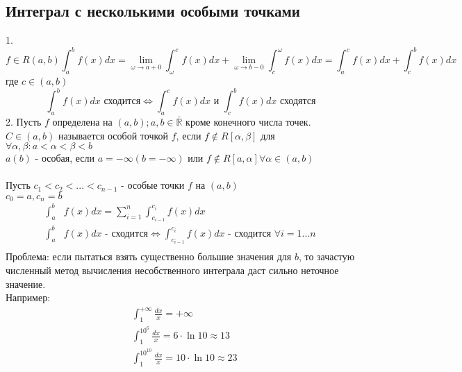 \documentclass{article}
\newcommand*{\R}{\mathbb{R}}
\begin{document}
\subsection{Интеграл с несколькими особыми точками}
1.
$$
    f \in R(a, b)
    \int_{a}^{b} f(x)dx = \displaystyle \lim_{\omega \to a + 0} \int_{\omega}^{c} f(x)dx + \displaystyle \lim_{\omega \to b - 0} \int_{c}^{\omega} f(x)dx = \int_{a}^{c} f(x)dx + \int_{c}^{b} f(x)dx
$$
где $c \in (a, b)$
$$
    \int_{a}^{b} f(x)dx \text{ сходится} \Leftrightarrow \int_{a}^{c}f(x)dx \text{ и } \int_{c}^{b} f(x)dx \text{ сходятся}
$$
2.
Пусть $f$ определена на $(a, b); a, b \in \bar{\R}$ кроме конечного числа точек. $C \in (a, b)$ называется особой точкой $f$, если $f \notin R[\alpha, \beta]$ для $\forall \alpha, \beta: a < \alpha < \beta < b$\\
$a (b)$ - особая, если $a = -\infty (b = -\infty)$ или $f \notin R[a, \alpha] \forall \alpha \in (a, b)$\\\\
Пусть $c_1 < c_2 < ... < c_{n-1}$ - особые точки $f$ на $(a, b)$ \\
$c_0 = a, c_n = b$ 
\begin{align*}
    \int_{a}^{b} &f(x)dx = \sum_{i = 1}^{n} \int_{c_{i - 1}}^{c_i} f(x)dx \\
    \int_{a}^{b} &f(x)dx \text{ - сходится} \Leftrightarrow \int_{c_{i - 1}}^{c_i} f(x)dx \text{ - сходится } \forall i = 1...n \\
\end{align*}
Проблема: если пытаться взять существенно большие значения для $b$, то зачастую численный метод вычисления несобственного интеграла даст сильно неточное значение.\\ Например:
\begin{align*}
    &\int_{1}^{+\infty} \frac{dx}{x} = +\infty\\
    &\int_{1}^{10^6} \frac{dx}{x} = 6 \cdot \ln10 \approx 13\\
    &\int_{1}^{10^{10}} \frac{dx}{x} = 10 \cdot \ln 10 \approx 23
\end{align*}
\end{document}
